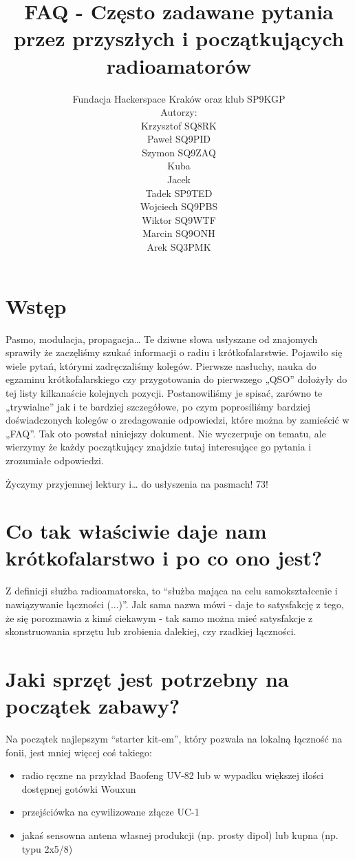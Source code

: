\documentclass[a4paper,12pt]{article}
\title{\textbf{FAQ - Często zadawane pytania przez przyszłych i początkujących radioamatorów}}
\author{Fundacja Hackerspace Kraków
oraz klub SP9KGP\\
Autorzy:\\
Krzysztof SQ8RK\\
Paweł SQ9PID\\
Szymon SQ9ZAQ\\
Kuba\\
Jacek\\
Tadek SP9TED\\
Wojciech SQ9PBS\\
Wiktor SQ9WTF\\
Marcin SQ9ONH\\
Arek SQ3PMK}
\begin{document}
\maketitle

\newpage
\newpage

\section{Wstęp}
Pasmo, modulacja, propagacja… Te dziwne słowa usłyszane od znajomych sprawiły że zaczęliśmy szukać informacji o radiu i krótkofalarstwie. Pojawiło się wiele pytań, którymi zadręczaliśmy kolegów. Pierwsze nasłuchy, nauka do egzaminu krótkofalarskiego czy przygotowania do pierwszego „QSO” dołożyły do tej listy kilkanaście kolejnych pozycji. Postanowiliśmy je spisać, zarówno te „trywialne” jak i te bardziej szczegółowe, po czym poprosiliśmy bardziej doświadczonych kolegów o zredagowanie odpowiedzi, które można by zamieścić w „FAQ”. Tak oto powstał niniejszy dokument. Nie wyczerpuje on tematu, ale wierzymy że każdy początkujący znajdzie tutaj interesujące go pytania i zrozumiałe odpowiedzi. 

Życzymy przyjemnej lektury i… do usłyszenia na pasmach! 73!

\section{Co tak właściwie daje nam krótkofalarstwo i po co ono jest?}
Z definicji służba radioamatorska, to ``służba mająca na celu samokształcenie i nawiązywanie łączności (...)''. Jak sama nazwa mówi - daje to satysfakcję z tego, że się porozmawia z kimś ciekawym - tak samo można mieć satysfakcje z skonstruowania sprzętu lub zrobienia dalekiej, czy rzadkiej łączności.

\section{Jaki sprzęt jest potrzebny na początek zabawy?}
Na początek najlepszym “starter kit-em”, który pozwala na lokalną łączność na fonii, jest mniej więcej coś takiego:
\begin{itemize}
 \item radio ręczne na przykład Baofeng UV-82 lub w wypadku większej ilości dostępnej gotówki Wouxun
 \item przejściówka na cywilizowane złącze UC-1
 \item jakaś sensowna antena własnej produkcji (np. prosty dipol) lub kupna (np. typu 2x5/8)
\end{itemize}
\end{document}
